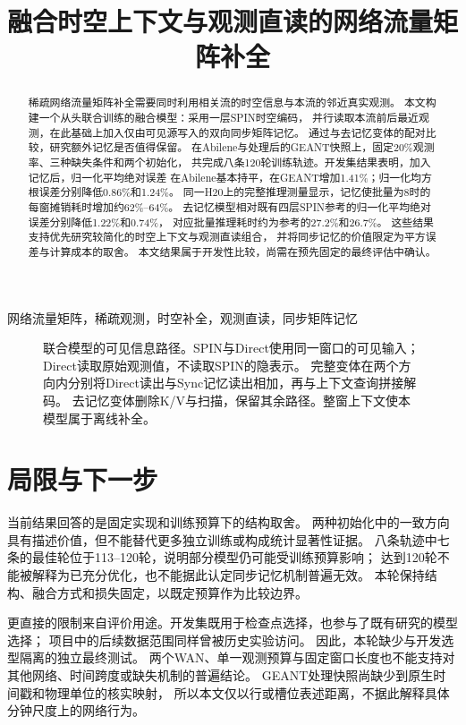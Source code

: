\documentclass[conference,10pt,letterpaper]{IEEEtran}
\title{融合时空上下文与观测直读的网络流量矩阵补全}
\author{\IEEEauthorblockN{作者信息待填写}
\IEEEauthorblockA{中文内部研究初稿\quad 2026 年 9 月 16 日}}
\begin{document}
\maketitle
\begin{abstract}
稀疏网络流量矩阵补全需要同时利用相关流的时空信息与本流的邻近真实观测。
本文构建一个从头联合训练的融合模型：采用一层SPIN时空编码，
并行读取本流前后最近观测，在此基础上加入仅由可见源写入的双向同步矩阵记忆。
通过与去记忆变体的配对比较，研究额外记忆是否值得保留。
在Abilene与处理后的GEANT快照上，固定20\%观测率、三种缺失条件和两个初始化，
共完成八条120轮训练轨迹。开发集结果表明，加入记忆后，归一化平均绝对误差
在Abilene基本持平，在GEANT增加1.41\%；归一化均方根误差分别降低0.86\%和1.24\%。
同一H20上的完整推理测量显示，记忆使批量为8时的每窗摊销耗时增加约62\%--64\%。
去记忆模型相对既有四层SPIN参考的归一化平均绝对误差分别降低1.22\%和0.74\%，
对应批量推理耗时约为参考的27.2\%和26.7\%。
这些结果支持优先研究较简化的时空上下文与观测直读组合，
并将同步记忆的价值限定为平方误差与计算成本的取舍。
本文结果属于开发性比较，尚需在预先固定的最终评估中确认。
\end{abstract}
\begin{IEEEkeywords}
网络流量矩阵，稀疏观测，时空补全，观测直读，同步矩阵记忆
\end{IEEEkeywords}

\begin{figure}[t]
\centering

\caption{联合模型的可见信息路径。SPIN与Direct使用同一窗口的可见输入；
Direct读取原始观测值，不读取SPIN的隐表示。
完整变体在两个方向内分别将Direct读出与Sync记忆读出相加，再与上下文查询拼接解码。
去记忆变体删除K/V与扫描，保留其余路径。整窗上下文使本模型属于离线补全。}
\label{fig:architecture}
\end{figure}




\section{局限与下一步}
当前结果回答的是固定实现和训练预算下的结构取舍。
两种初始化中的一致方向具有描述价值，但不能替代更多独立训练或构成统计显著性证据。
八条轨迹中七条的最佳轮位于113--120轮，说明部分模型仍可能受训练预算影响；
达到120轮不能被解释为已充分优化，也不能据此认定同步记忆机制普遍无效。
本轮保持结构、融合方式和损失固定，以既定预算作为比较边界。

更直接的限制来自评价用途。开发集既用于检查点选择，也参与了既有研究的模型选择；
项目中的后续数据范围同样曾被历史实验访问。
因此，本轮缺少与开发选型隔离的独立最终测试。
两个WAN、单一观测预算与固定窗口长度也不能支持对其他网络、时间跨度或缺失机制的普遍结论。
GEANT处理快照尚缺少到原生时间戳和物理单位的核实映射，
所以本文仅以行或槽位表述距离，不据此解释具体分钟尺度上的网络行为。
\end{document}
